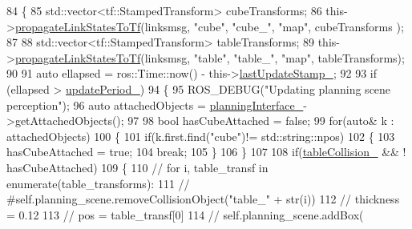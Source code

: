\begin{DoxyCode}
84   \{
85       std::vector<tf::StampedTransform> cubeTransforms;
86       this->\hyperlink{classsm__moveit__3_1_1cl__perception__system_1_1ClPerceptionSystem_a1084d40600fb5764c48447877a3683ef}{propagateLinkStatesToTf}(linksmsg, \textcolor{stringliteral}{"cube"}, \textcolor{stringliteral}{"cube\_"}, \textcolor{stringliteral}{"map"}, cubeTransforms
      );
87 
88       std::vector<tf::StampedTransform> tableTransforms;
89       this->\hyperlink{classsm__moveit__3_1_1cl__perception__system_1_1ClPerceptionSystem_a1084d40600fb5764c48447877a3683ef}{propagateLinkStatesToTf}(linksmsg, \textcolor{stringliteral}{"table"}, \textcolor{stringliteral}{"table\_"}, \textcolor{stringliteral}{"map"}, 
      tableTransforms);
90 
91       \textcolor{keyword}{auto} ellapsed = ros::Time::now() - this->\hyperlink{classsm__moveit__3_1_1cl__perception__system_1_1ClPerceptionSystem_a6f6130fd8e122238855516f6e74eb4e7}{lastUpdateStamp\_};
92 
93       \textcolor{keywordflow}{if} (ellapsed > \hyperlink{classsm__moveit__3_1_1cl__perception__system_1_1ClPerceptionSystem_afc43ae86f2e0074f1ef1650284f54deb}{updatePeriod\_})
94       \{
95           ROS\_DEBUG(\textcolor{stringliteral}{"Updating planning scene perception"});
96           \textcolor{keyword}{auto} attachedObjects = \hyperlink{classsm__moveit__3_1_1cl__perception__system_1_1ClPerceptionSystem_aa59191e3993ffbfc8e8332f76d727259}{planningInterface\_}->getAttachedObjects();
97 
98           \textcolor{keywordtype}{bool} hasCubeAttached = \textcolor{keyword}{false};
99           \textcolor{keywordflow}{for}(\textcolor{keyword}{auto}& k : attachedObjects)
100           \{
101               \textcolor{keywordflow}{if}(k.first.find(\textcolor{stringliteral}{"cube"})!= std::string::npos)
102               \{
103                  hasCubeAttached = \textcolor{keyword}{true};
104                  \textcolor{keywordflow}{break}; 
105               \}
106           \}
107 
108         \textcolor{keywordflow}{if}(\hyperlink{classsm__moveit__3_1_1cl__perception__system_1_1ClPerceptionSystem_a5f5208264dee3b68129e1d9560867f01}{tableCollision\_} && ! hasCubeAttached)
109         \{
110         \textcolor{comment}{//         for i, table\_transf in enumerate(table\_transforms):}
111         \textcolor{comment}{//             #self.planning\_scene.removeCollisionObject("table\_" + str(i))}
112         \textcolor{comment}{//             thickness = 0.12}
113         \textcolor{comment}{//             pos = table\_transf[0]}
114         \textcolor{comment}{//             self.planning\_scene.addBox(}

\end{DoxyCode}
